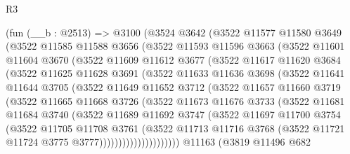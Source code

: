 \begin{lexlean}{R3}
\begin{coremodule}
    (fun (__b : @2513) =>
    @3100
      (@3524
        @3642
        (@3522
          @11577
          @11580
          @3649
          (@3522
            @11585
            @11588
            @3656
            (@3522
              @11593
              @11596
              @3663
              (@3522
                @11601
                @11604
                @3670
                (@3522
                  @11609
                  @11612
                  @3677
                  (@3522
                    @11617
                    @11620
                    @3684
                    (@3522
                      @11625
                      @11628
                      @3691
                      (@3522
                        @11633
                        @11636
                        @3698
                        (@3522
                          @11641
                          @11644
                          @3705
                          (@3522
                            @11649
                            @11652
                            @3712
                            (@3522
                              @11657
                              @11660
                              @3719
                              (@3522
                                @11665
                                @11668
                                @3726
                                (@3522
                                  @11673
                                  @11676
                                  @3733
                                  (@3522
                                    @11681
                                    @11684
                                    @3740
                                    (@3522
                                      @11689
                                      @11692
                                      @3747
                                      (@3522
                                        @11697
                                        @11700
                                        @3754
                                        (@3522
                                          @11705
                                          @11708
                                          @3761
                                          (@3522
                                            @11713
                                            @11716
                                            @3768
                                            (@3522 @11721 @11724 @3775 @3777)))))))))))))))))))))
    @11163
    (@3819
      @11496
      @682

\end{coremodule}
\end{lexlean}
